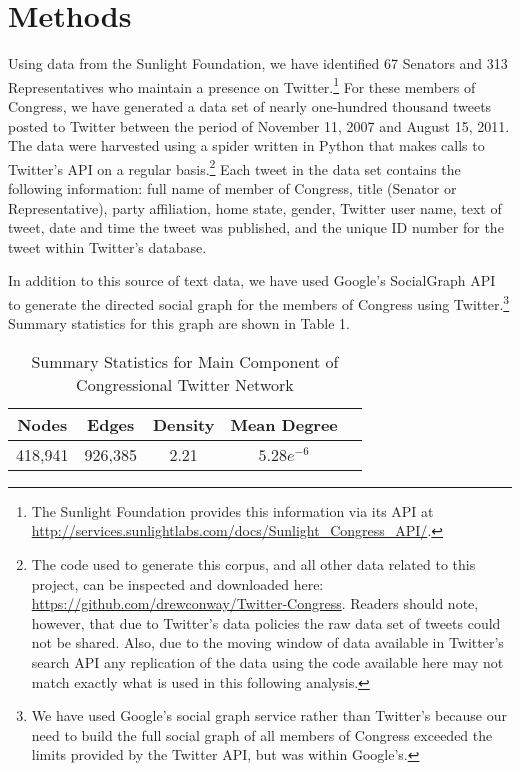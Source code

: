 \documentclass[10pt]{article}
\begin{document}
\section{Methods}
Using data from the Sunlight Foundation, we have identified 67 Senators and 313 Representatives who maintain a presence on Twitter.\footnote{The Sunlight Foundation provides this information via its API at \url{http://services.sunlightlabs.com/docs/Sunlight_Congress_API/}.} For these members of Congress, we have generated a data set of nearly one-hundred thousand tweets posted to Twitter between the period of November 11, 2007 and August 15, 2011.  The data were harvested using a spider written in Python that makes calls to Twitter's API on a regular basis.\footnote{The code used to generate this corpus, and all other data related to this project, can be inspected and downloaded here: \url{https://github.com/drewconway/Twitter-Congress}.  Readers should note, however, that due to Twitter's data policies the raw data set of tweets could not be shared.  Also, due to the moving window of data available in Twitter's search API any replication of the data using the code available here may not match exactly what is used in this following analysis.}  Each tweet in the data set contains the following information: full name of member of Congress, title (Senator or Representative), party affiliation, home state, gender, Twitter user name, text of tweet, date and time the tweet was published, and the unique ID number for the tweet within Twitter's database.

In addition to this source of text data, we have used Google's SocialGraph API to generate the directed social graph for the members of Congress using Twitter.\footnote{We have used Google's social graph service rather than Twitter's because our need to build the full social graph of all members of Congress exceeded the limits provided by the Twitter API, but was within Google's.} Summary statistics for this graph are shown in Table 1. %

\begin{table}[htdp]
    \centering
    \caption{Summary Statistics for Main Component of Congressional Twitter Network}
    \begin{tabular}{|c|c|c|c|c|}
        \hline
        Nodes & Edges & Density & Mean Degree \\ \hline
        418,941 & 926,385 & 2.21 & $5.28e^{-6}$ \\ \hline
    \end{tabular}
\end{table}
\end{document}
